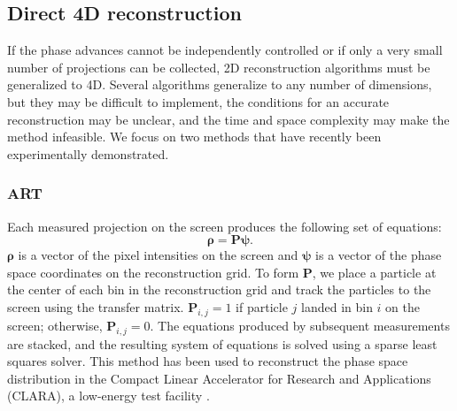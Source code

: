 \subsection{Direct 4D reconstruction}

If the phase advances cannot be independently controlled or if only a very small number of projections can be collected, 2D reconstruction algorithms must be generalized to 4D. Several algorithms generalize to any number of dimensions, but they may be difficult to implement, the conditions for an accurate reconstruction may be unclear, and the time and space complexity may make the method infeasible. We focus on two methods that have recently been experimentally demonstrated.


\subsubsection{ART}

Each measured projection on the screen produces the following set of equations:
%
\begin{equation}\label{eq:art}
    \bm{\rho} = \mathbf{P} \bm{\psi}.
\end{equation}
%
$\bm{\rho}$ is a vector of the pixel intensities on the screen and $\bm{\psi}$ is a vector of the phase space coordinates on the reconstruction grid. To form $\mathbf{P}$, we place a particle at the center of each bin in the reconstruction grid and track the particles to the screen using the transfer matrix. $\mathbf{P}_{i, j} = 1$ if particle $j$ landed in bin $i$ on the screen; otherwise, $\mathbf{P}_{i, j} = 0$. The equations produced by subsequent measurements are stacked, and the resulting system of equations is solved using a sparse least squares solver. This method has been used to reconstruct the phase space distribution in the Compact Linear Accelerator for Research and Applications (CLARA), a low-energy test facility \cite{Wolski2020}.

